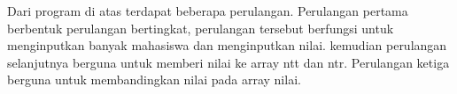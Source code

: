 \documentclass[a4paper,12pt]{article}
\begin{document}
Dari program di atas terdapat beberapa perulangan. Perulangan pertama berbentuk perulangan bertingkat, perulangan tersebut berfungsi untuk menginputkan banyak
mahasiswa dan menginputkan nilai. kemudian perulangan selanjutnya berguna untuk memberi nilai ke array ntt dan ntr. Perulangan ketiga berguna untuk membandingkan 
nilai pada array nilai. 
\end{document}

